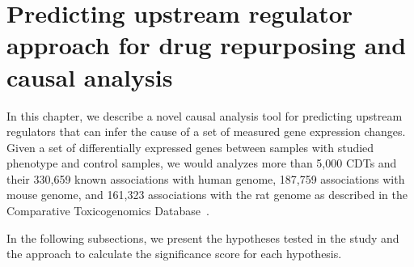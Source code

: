 \section{Predicting upstream regulator approach for drug repurposing and causal analysis}



\label{chap:PURE}



In this chapter, we describe a novel causal analysis tool for predicting upstream regulators that can infer the cause of a set of measured gene expression changes. 
Given a set of differentially expressed genes between samples with studied phenotype and control samples, we would analyzes more  than 5,000 CDTs and their 330,659 known associations with human genome, 187,759 associations with mouse genome, and 161,323 associations with the rat genome as described in the Comparative Toxicogenomics Database~\cite{mattingly2006comparative}. 
 
 
In the following subsections, we present the hypotheses tested in the study and the approach to calculate the significance score for each hypothesis.


